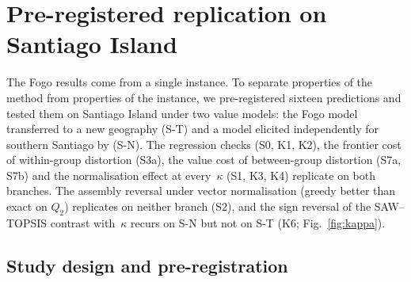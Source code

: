 \FloatBarrier
\section{Pre-registered replication on Santiago Island}
\label{sec:santiago}

The Fogo results come from a single instance.
To separate properties of the method from properties of the instance,
we pre-registered sixteen predictions and tested them on Santiago Island
under two value models: the Fogo model transferred to a new geography
(S-T) and a model elicited independently for southern Santiago by
\citet{Cabral2012} (S-N).
The regression checks (S0, K1, K2), the frontier cost of within-group
distortion (S3a), the value cost of between-group distortion (S7a, S7b)
and the normalisation effect at every~$\kappa$ (S1, K3, K4) replicate on
both branches.
The assembly reversal under vector normalisation (greedy better than
exact on $Q_2$) replicates on neither branch (S2), and the sign reversal
of the SAW--TOPSIS contrast with~$\kappa$ recurs on S-N but not on S-T
(K6; Fig.~\ref{fig:kappa}).

\subsection{Study design and pre-registration}
\label{sec:santiago-design}

